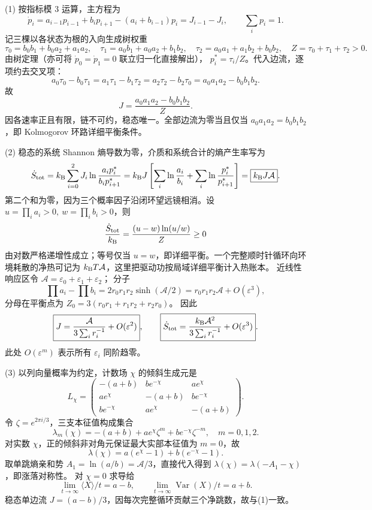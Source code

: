(1) 按指标模 \(3\) 运算，主方程为
\[
 \dot p_i=a_{i-1}p_{i-1}+b_i p_{i+1}-(a_i+b_{i-1})p_i
 =J_{i-1}-J_i,\qquad \sum_i p_i=1.
\]
记三棵以各状态为根的入向生成树权重
\[
 \tau_0=b_0b_1+b_0a_2+a_1a_2,\quad
 \tau_1=a_0b_1+a_0a_2+b_1b_2,\quad
 \tau_2=a_0a_1+a_1b_2+b_0b_2,\quad Z=\tau_0+\tau_1+\tau_2>0.
\]
由树定理（亦可将 \(\dot p_0=\dot p_1=0\) 联立归一化直接解出），
\(\boxed{p_i^*=\tau_i/Z}\)。代入边流，逐项约去交叉项：
\[
 a_0\tau_0-b_0\tau_1
 =a_1\tau_1-b_1\tau_2
 =a_2\tau_2-b_2\tau_0=a_0a_1a_2-b_0b_1b_2.
\]
故
\[
 \boxed{J=\frac{a_0a_1a_2-b_0b_1b_2}{Z}}.
\]
因各速率正且有限，链不可约，稳态唯一。全部边流为零当且仅当
\(a_0a_1a_2=b_0b_1b_2\)，即 Kolmogorov 环路详细平衡条件。

(2) 稳态的系统 Shannon 熵导数为零，介质和系统合计的熵产生率写为
\[
 \dot S_{\rm tot}
 =k_{\rm B}\sum_{i=0}^2 J_i
 \ln\frac{a_i p_i^*}{b_i p_{i+1}^*}
 =k_{\rm B}J\left[\sum_i\ln\frac{a_i}{b_i}
       +\sum_i\ln\frac{p_i^*}{p_{i+1}^*}\right]
 =\boxed{k_{\rm B}J\mathcal A}.
\]
第二个和为零，因为三个概率因子沿闭环望远镜相消。设
\(u=\prod_i a_i>0,\ w=\prod_i b_i>0\)，则
\[
 \frac{\dot S_{\rm tot}}{k_{\rm B}}
 =\frac{(u-w)\ln(u/w)}Z\ge0
\]
由对数严格递增性成立；等号仅当 \(u=w\)，即详细平衡。一个完整顺时针循环向环境耗散的净热可记为 \(k_{\rm B}T\mathcal A\)，这里把驱动功按局域详细平衡计入热账本。
近线性响应区令 \(\mathcal A=\varepsilon_0+\varepsilon_1+\varepsilon_2\)；
分子
\[
 \prod a_i-\prod b_i
 =2r_0r_1r_2\sinh(\mathcal A/2)
 =r_0r_1r_2\mathcal A+O(\varepsilon^3),
\]
分母在平衡点为 \(Z_0=3(r_0r_1+r_1r_2+r_2r_0)\)。
因此
\[
 \boxed{J=\frac{\mathcal A}{3\sum_i r_i^{-1}}+O(\varepsilon^2)},\qquad
 \boxed{\dot S_{\rm tot}
 =\frac{k_{\rm B}\mathcal A^2}{3\sum_i r_i^{-1}}+O(\varepsilon^3)}.
\]
此处 \(O(\varepsilon^m)\) 表示所有 \(\varepsilon_i\) 同阶趋零。

(3) 以列向量概率为约定，计数场 \(\chi\) 的倾斜生成元是
\[
 L_\chi=\begin{pmatrix}
 -(a+b)&b e^{-\chi}&a e^\chi\\
 a e^\chi&-(a+b)&b e^{-\chi}\\
 b e^{-\chi}&a e^\chi&-(a+b)
 \end{pmatrix}.
\]
令 \(\zeta=e^{2\pi i/3}\)，三支本征值构成集合
\[
 \lambda_m(\chi)=-(a+b)+a e^\chi\zeta^m+b e^{-\chi}\zeta^{-m},
 \quad m=0,1,2.
\]
对实数 \(\chi\)，正的倾斜非对角元保证最大实部本征值为 \(m=0\)，故
\[
 \boxed{\lambda(\chi)=a(e^\chi-1)+b(e^{-\chi}-1)}.
\]
取单跳熵亲和势 \(A_1=\ln(a/b)=\mathcal A/3\)，直接代入得到
\(\boxed{\lambda(\chi)=\lambda(-A_1-\chi)}\)，即涨落对称性。
对 \(\chi=0\) 求导给
\[
 \boxed{\lim_{t\to\infty}\langle X\rangle/t=a-b},\qquad
 \boxed{\lim_{t\to\infty}\operatorname{Var}(X)/t=a+b}.
\]
稳态单边流 \(J=(a-b)/3\)，因每次完整循环贡献三个净跳数，故与(1)一致。

